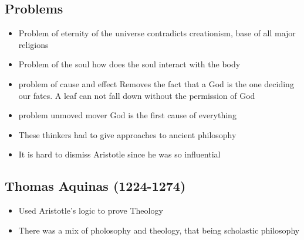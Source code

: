 \documentclass{article}
\begin{document}
\subsection{Problems}
\begin{itemize}
  \item Problem of eternity of the universe \rightarrow{} contradicts creationism, base of all major religions
  \item Problem of the soul \rightarrow{} how does the soul interact with the body
  \item problem of cause and effect \rightarrow{} Removes the fact that a God is the
    one deciding our fates. A leaf can not fall down without the permission of God
  \item problem unmoved mover \rightarrow{} God is the first cause of everything
  \item These thinkers had to give approaches to ancient philosophy
  \item It is hard to dismiss Aristotle since he was so influential
\end{itemize}

\subsection{Thomas Aquinas (1224-1274)}
\begin{itemize}
  \item Used Aristotle's logic to prove Theology
  \item There was a mix of pholosophy and theology, that being scholastic philosophy
\end{itemize}
\end{document}
